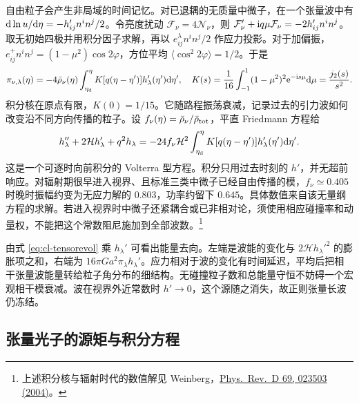 自由粒子会产生非局域的时间记忆。对已退耦的无质量中微子，在一个张量波中有 $\dd\ln u/\dd\eta=-h_{ij}'n^i n^j/2$。令亮度扰动 $\mathcal F_\nu=4\mathcal N_\nu$，则 $\mathcal F_\nu'+\mathrm{i} q\mu\mathcal F_\nu=-2h_{ij}'n^i n^j$。取无初始四极并用积分因子求解，再以 $e^\lambda_{ij}n^in^j/2$ 作应力投影。对于加偏振，$e^+_{ij}n^i n^j=(1-\mu^2)\cos2\varphi$，方位平均 $\langle\cos^2 2\varphi\rangle=1/2$。于是
\[
 \pi_{\nu,\lambda}(\eta)=-4\bar\rho_\nu(\eta)
       \int_{\eta_{\rm d}}^\eta K[q(\eta-\eta')]h_\lambda'(\eta')\dd\eta',
 \quad
 K(s)=\frac1{16}\int_{-1}^1(1-\mu^2)^2\mathrm{e}^{-\mathrm{i} s\mu}\dd\mu
     =\frac{j_2(s)}{s^2}.
\]
积分核在原点有限，$K(0)=1/15$。它随路程振荡衰减，记录过去的引力波如何改变沿不同方向传播的粒子。设 $f_\nu(\eta)=\bar\rho_\nu/\bar\rho_{\rm tot}$，平直 Friedmann 方程给
\[
 h_\lambda''+2\mathcal Hh_\lambda'+q^2h_\lambda
  =-24 f_\nu\mathcal H^2
       \int_{\eta_{\rm d}}^\eta K[q(\eta-\eta')]h_\lambda'(\eta')\dd\eta' .
\]
这是一个可逐时向前积分的 Volterra 型方程。积分只用过去时刻的 $h'$，并无超前响应。对辐射期很早进入视界、且标准三类中微子已经自由传播的模，$f_\nu\simeq0.405$ 时晚时振幅约变为无应力解的 $0.803$，功率约留下 $0.645$。具体数值来自该无量纲方程的求解。若进入视界时中微子还紧耦合或已非相对论，须使用相应碰撞率和动量权，不能把这个常数阻尼施加到全部波数。\footnote{上述积分核与辐射时代的数值解见 Weinberg，\href{https://doi.org/10.1103/PhysRevD.69.023503}{Phys.\ Rev.\ D 69, 023503 (2004)}。}

由式 \eqref{eq:cl-tensorevol} 乘 $h_\lambda'$ 可看出能量去向。左端是波能的变化与 $2\mathcal Hh_\lambda'^2$ 的膨胀项之和，右端为 $16\pi G a^2\pi_\lambda h_\lambda'$。应力相对于波的变化有时间延迟，平均后把相干张量波能量转给粒子角分布的细结构。无碰撞粒子数和总能量守恒不妨碍一个宏观相干模衰减。波在视界外近常数时 $h'\to0$，这个源随之消失，故正则张量长波仍冻结。

\subsection{张量光子的源矩与积分方程}

